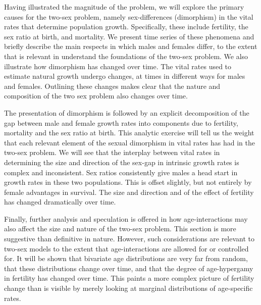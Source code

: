 Having illustrated the magnitude of the problem, we will explore the primary
causes for the two-sex problem, namely sex-differences (dimorphism) in the vital rates
that determine population growth. Specifically, these include fertility, the sex
ratio at birth, and mortality. We present time series of these phenomena and
briefly describe the main respects in which males and females differ, to the
extent that is relevant in understand the foundations of the two-sex problem. We
also illustrate how dimorphism has changed over time. The vital rates
used to estimate natural growth undergo changes, at times in different ways for
males and females. Outlining these changes makes clear that the nature and
composition of the two sex problem also changes over time.

The presentation of dimorphism is followed by an explicit decomposition of the
gap between male and female growth rates into components due to fertility,
mortality and the sex ratio at birth. This analytic exercise will tell us the
weight that each relevant element of the sexual dimorphism in vital rates has
had in the two-sex problem. We will see that the interplay between vital rates
in determining the size and direction of the sex-gap in intrinsic growth rates
is complex and inconsistent. Sex ratios consistently give males a head start in
growth rates in these two populations. This is offset slightly, but not entirely
by female advantages in survival. The size and direction and of the effect of
fertility has changed dramatically over time.

Finally, further analysis and speculation is offered in how age-interactions may
also affect the size and nature of the two-sex problem. This section is more
suggestive than definitive in nature. However, such considerations are relevant
to two-sex models to the extent that age-interactions are allowed for or
controlled for. It will be shown that bivariate age distributions are very far
from random, that these distributions change over time, and that the degree of
age-hypergamy in fertility has changed over time. This paints a more complex
picture of fertility change than is visible by merely looking at marginal
distributions of age-specific rates.









